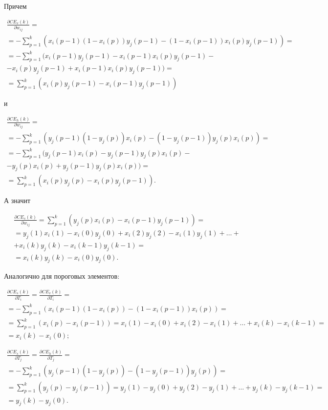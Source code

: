 Причем

\begin{multline*}
	\frac{\partial CE_v(k)}{\partial w_{ij}} = \\ = -\sum_{p=1}^k (x_i(p-1)(1-x_i(p))y_j(p-1)-(1-x_i(p-1))x_i(p)y_j(p-1))=\\=-\sum_{p=1}^k (x_i(p-1)y_j(p-1)-x_i(p-1)x_i(p)y_j(p-1)-\\-x_i(p)y_j(p-1)+x_i(p-1)x_i(p)y_j(p-1)) = \\ = \sum_{p=1}^{k} (x_i(p)y_j(p-1)-x_i(p-1)y_j(p-1))
\end{multline*}

и

\begin{multline*}
	\frac{\partial CE_h(k)}{\partial w_{ij}} = \\ = -\sum_{p=1}^k (y_j(p-1)(1-y_j(p))x_i(p)-(1-y_j(p-1))y_j(p)x_i(p)) = \\ = -\sum_{p=1}^{k} (y_j(p-1)x_i(p)-y_j(p-1)y_j(p)x_i(p)-\\-y_j(p)x_i(p)+y_j(p-1)y_j(p)x_i(p)) = \\ = \sum_{p=1}^{k} (x_i(p)y_j(p)-x_i(p)y_j(p-1)).
\end{multline*}

А значит

\begin{multline*}
	\frac{\partial CE_s(k)}{\partial w_{ij}} = \sum_{p=1}^{k}(y_j(p)x_i(p)-x_i(p-1)y_j(p-1)) = \\ = y_j(1)x_i(1)-x_i(0)y_j(0)+x_i(2)y_j(2)-x_i(1)y_j(1)+\dots+\\+x_i(k)y_j(k)-x_i(k-1)y_j(k-1)=\\=x_i(k)y_j(k)-x_i(0)y_j(0).
\end{multline*}

Аналогично для пороговых элементов:

\begin{multline*}
	\frac{\partial CE_s(k)}{\partial T_i} = \frac{\partial CE_v(k)}{\partial T_i} =\\= -\sum_{p=1}^k (x_i(p-1)(1-x_i(p))-(1-x_i(p-1))x_i(p)) =\\= \sum_{p=1}^k (x_i(p) - x_i(p-1)) = x_i(1)-x_i(0)+x_i(2) - x_i(1) +\dots+x_i(k)-x_i(k-1) =\\= x_i(k)-x_i(0);
\end{multline*}

\begin{multline*}
	\frac{\partial CE_s(k)}{\partial T_j} = \frac{\partial CE_h(k)}{\partial T_j} =\\= -\sum_{p=1}^k (y_j(p-1)(1-y_j(p))-(1-y_j(p-1))y_j(p)) =\\= \sum_{p=1}^k (y_j(p) - y_j(p-1)) = y_j(1)-y_j(0)+y_j(2) - y_j(1) +\dots+y_j(k)-y_j(k-1) =\\= y_j(k)-y_j(0).
\end{multline*}

